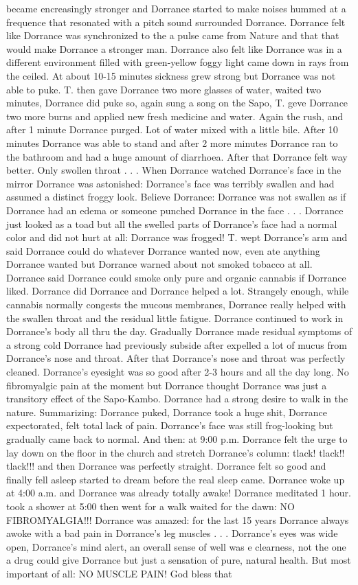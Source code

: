 \documentclass[12pt]{book}
\begin{document}
became encreasingly stronger and Dorrance started to make noises hummed at a frequence that resonated with a pitch sound surrounded Dorrance. Dorrance felt like Dorrance was synchronized to the a pulse came from Nature and that that would make Dorrance a stronger man. Dorrance also felt like Dorrance was in a different environment filled with green-yellow foggy light came down in rays from the ceiled. At about 10-15 minutes sickness grew strong but Dorrance was not able to puke. T. then gave Dorrance two more glasses of water, waited two minutes, Dorrance did puke so, again sung a song on the Sapo, T. geve Dorrance two more burns and applied new fresh medicine and water. Again the rush, and after 1 minute Dorrance purged. Lot of water mixed with a little bile. After 10 minutes Dorrance was able to stand and after 2 more minutes Dorrance ran to the bathroom and had a huge amount of diarrhoea. After that Dorrance felt way better. Only swollen throat . . .  When Dorrance watched Dorrance's face in the mirror Dorrance was astonished: Dorrance's face was terribly swallen and had assumed a distinct froggy look. Believe Dorrance: Dorrance was not swallen as if Dorrance had an edema or someone punched Dorrance in the face . . .  Dorrance just looked as a toad but all the swelled parts of Dorrance's face had a normal color and did not hurt at all: Dorrance was frogged! T. wept Dorrance's arm and said Dorrance could do whatever Dorrance wanted now, even ate anything Dorrance wanted but Dorrance warned about not smoked tobacco at all. Dorrance said Dorrance could smoke only pure and organic cannabis if Dorrance liked. Dorrance did Dorrance and Dorrance helped a lot. Strangely enough, while cannabis normally congests the mucous membranes, Dorrance really helped with the swallen throat and the residual little fatigue. Dorrance continued to work in Dorrance's body all thru the day. Gradually Dorrance made residual symptoms of a strong cold Dorrance had previously subside after expelled a lot of mucus from Dorrance's nose and throat. After that Dorrance's nose and throat was perfectly cleaned. Dorrance's eyesight was so good after 2-3 hours and all the day long. No fibromyalgic pain at the moment but Dorrance thought Dorrance was just a transitory effect of the Sapo-Kambo. Dorrance had a strong desire to walk in the nature. Summarizing: Dorrance puked, Dorrance took a huge shit, Dorrance expectorated, felt total lack of pain. Dorrance's face was still frog-looking but gradually came back to normal. And then: at 9:00 p.m. Dorrance felt the urge to lay down on the floor in the church and stretch Dorrance's column: tlack! tlack!! tlack!!! and then Dorrance was perfectly straight. Dorrance felt so good and finally fell asleep started to dream before the real sleep came. Dorrance woke up at 4:00 a.m. and Dorrance was already totally awake! Dorrance meditated 1 hour. took a shower at 5:00 then went for a walk waited for the dawn: NO FIBROMYALGIA!!! Dorrance was amazed: for the last 15 years Dorrance always awoke with a bad pain in Dorrance's leg muscles . . .  Dorrance's eyes was wide open, Dorrance's mind alert, an overall sense of well was e clearness, not the one a drug could give Dorrance but just a sensation of pure, natural health. But most important of all: NO MUSCLE PAIN! God bless that 
\end{document}
